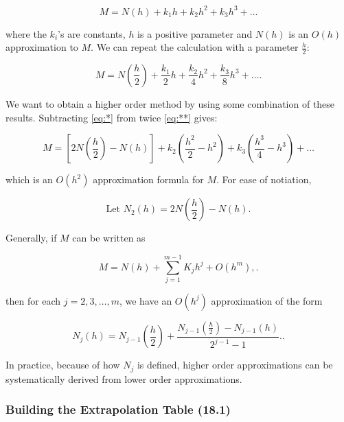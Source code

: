 \begin{equation}
M = N(h) + k_1h + k_2h^2 + k_3h^3 + \dots
\label{eq:*}
\end{equation}

\noindent where the $k_i$'s are constants, $h$ is a positive parameter and
$N(h)$ is an $O(h)$ approximation to $M$. We can repeat the calculation with a
parameter $\frac{h}{2}$:

\begin{equation}
M=N\left(\frac{h}{2}\right) + \frac{k_1}{2}h + \frac{k_2}{4}h^2 + \frac{k_3}{8}h^3 + \dots
\label{eq:**}
.\end{equation}

We want to obtain a higher order method by using some combination of these
results. 
Subtracting \eqref{eq:*} from twice \eqref{eq:**} gives:

\begin{equation}
  M = \left[2N\left(\frac{h}{2}\right) - N(h)\right] + k_2\left(\frac{h^2}{2} 
  - h^2\right) + k_3 \left(\frac{h^3}{4}-h^3\right) + \dots
  \label{eq:?}
\end{equation}

\noindent
which is an $O(h^2)$ approximation formula for $M$. For ease of notiation, 

\[
\text{Let } N_2(h) = 2N\left(\frac{h}{2}\right) - N(h)
.\]

\noindent
Generally, if $M$ can be written as

\[
  M = N(h) + \sum_{j=1}^{m-1} K_j h^j + O(h^m),
.\]

\noindent
then for each $j = 2, 3, \dots, m$, we have an $O(h^j)$ approximation of the form

\[
  N_j(h) = N_{j-1} \left(\frac{h}{2}\right) + \frac{N_{j-1} \left(\frac{h}{2}\right) - N_{j-1}(h)}{2^{j-1} - 1}.
.\]

In practice, because of how $N_j$ is defined, higher order approximations can 
be systematically derived from lower order approximations.

\subsubsection{Building the Extrapolation Table (18.1)}\label{sec:building_the_extrapolation_table}

